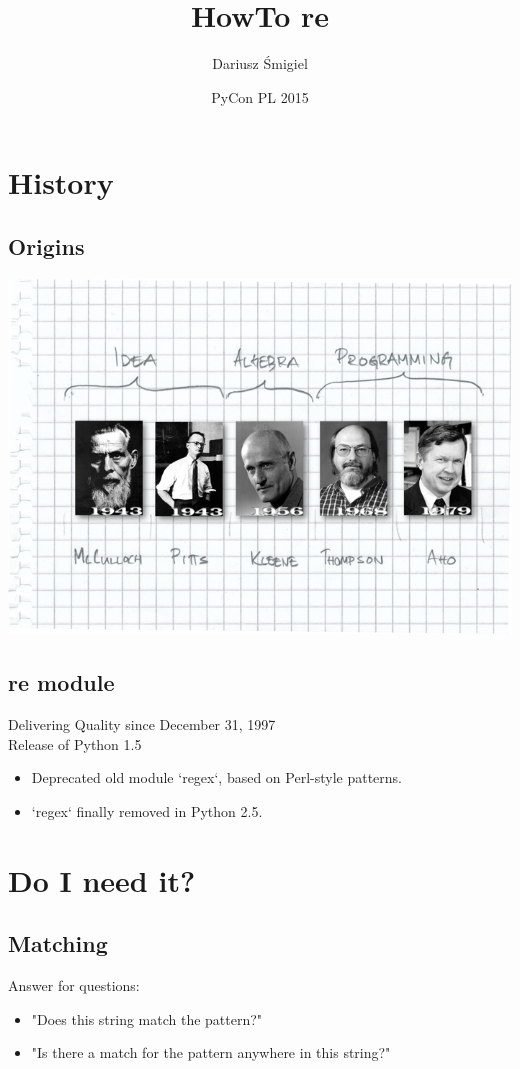 \documentclass{beamer}
\title{HowTo re}
\author{Dariusz Śmigiel}
\date{PyCon PL 2015}
\begin{document}
\begin{frame}
\titlepage
\end{frame}

\section{History}
\subsection{Origins}
\begin{frame}
\includegraphics[width=1\textwidth]{images/history.png}
\end{frame}

\subsection{re module}
\begin{frame}
Delivering Quality since December 31, 1997 \\
\pause
Release of Python 1.5
\pause

\begin{itemize}
 \item Deprecated old module `regex`, based on Perl-style patterns.
\pause
 \item `regex` finally removed in Python 2.5.
\end{itemize}
\end{frame}

\section{Do I need it?}
\subsection{Matching}
\begin{frame}
Answer for questions:
 \begin{itemize}
  \item "Does this string match the pattern?"
  \item "Is there a match for the pattern anywhere in this string?"
 \end{itemize}
\end{frame}
\end{document}
